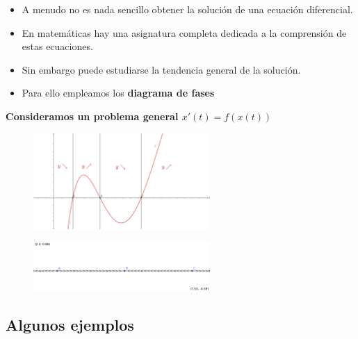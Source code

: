 \documentclass[8pt]{beamer}
\begin{document}
\begin{frame}
\begin{itemize}
\item A menudo no es nada sencillo obtener la solución de una ecuación diferencial.
\item En matemáticas hay una asignatura completa dedicada a la comprensión de estas ecuaciones.
\item Sin embargo puede estudiarse la tendencia general de la solución.
\item Para ello empleamos los \textbf{diagrama de fases}
\end{itemize}

\textbf{Consideramos un problema general $x'(t)=f(x(t))$}
\begin{figure}[hbtp]
\centering
\includegraphics[width = 0.6\textwidth]{img/propiedades-autonomas.png}
\end{figure}

\begin{figure}[hbtp]
\centering
\includegraphics[width = 0.6\textwidth]{img/diagrama-fases.png}
\end{figure}

\end{frame}
\subsection{Algunos ejemplos}
\end{document}
